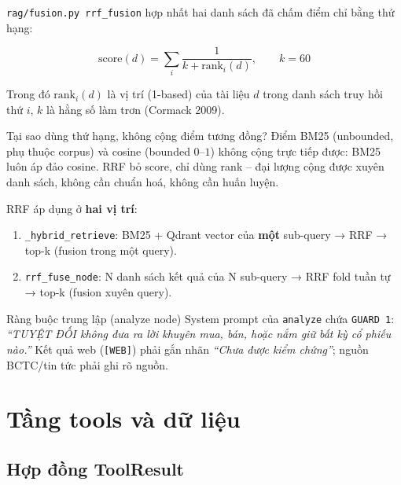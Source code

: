\documentclass[12pt, a4paper]{report}
\begin{document}
\texttt{rag/fusion.py rrf\_fusion} hợp nhất hai danh sách đã chấm điểm chỉ bằng thứ hạng:

\begin{equation}
\text{score}(d) = \sum_{i} \frac{1}{k + \text{rank}_i(d)},
\qquad k = 60
\label{eq:rrf}
\end{equation}

Trong đó $\text{rank}_i(d)$ là vị trí (1-based) của tài liệu $d$ trong danh sách truy hồi thứ $i$, $k$ là hằng số làm trơn (Cormack 2009).

\begin{keybox}{Tại sao dùng thứ hạng, không cộng điểm tương đồng?}
Điểm BM25 (unbounded, phụ thuộc corpus) và cosine (bounded $0$--$1$) không cộng trực tiếp được: BM25 luôn áp đảo cosine. RRF bỏ score, chỉ dùng rank -- đại lượng cộng được xuyên danh sách, không cần chuẩn hoá, không cần huấn luyện.
\end{keybox}

RRF áp dụng ở \textbf{hai vị trí}:

\begin{enumerate}
  \item \texttt{\_hybrid\_retrieve}: BM25 + Qdrant vector của \textbf{một} sub-query → RRF → top-k (fusion trong một query).
  \item \texttt{rrf\_fuse\_node}: N danh sách kết quả của N sub-query → RRF fold tuần tự → top-k (fusion xuyên query).
\end{enumerate}

\begin{warnbox}{Ràng buộc trung lập (analyze node)}
System prompt của \texttt{analyze} chứa \texttt{GUARD 1}: \textit{``TUYỆT ĐỐI không đưa ra lời khuyên mua, bán, hoặc nắm giữ bất kỳ cổ phiếu nào.''} Kết quả web (\texttt{[WEB]}) phải gắn nhãn \textit{``Chưa được kiểm chứng''}; nguồn BCTC/tin tức phải ghi rõ nguồn.
\end{warnbox}

\newpage

\chapter{Tầng tools và dữ liệu}

\section{Hợp đồng ToolResult}
\end{document}

